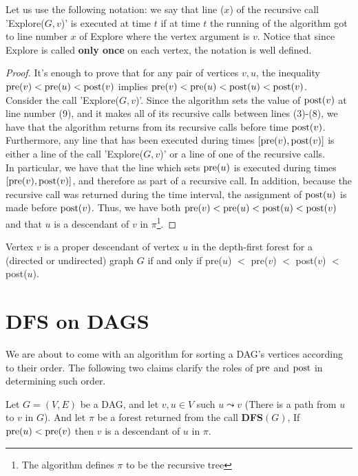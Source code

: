 Let us use the following notation: we say that line ($x$) of the recursive call 'Explore($G,v$)' is executed at time $t$ if at time $t$ the running of the algorithm got to line number $x$ of Explore where the vertex argument is $v$. Notice that since Explore is called \textbf{only once} on each vertex, the notation is well defined.
\begin{proof}
  
It's enough to prove that for any pair of vertices $v, u$, the inequality $\text{pre}(v) < \text{pre}(u) < \text{post}(v)$ implies $\text{pre}(v) < \text{pre}(u) < \text{post}(u) < \text{post}(v)$. \\


Consider the call 'Explore($G,v$)'. Since the algorithm sets the value of $\text{post}(v)$ at line number (9), and it makes all of its recursive calls between lines (3)-(8), we have that the algorithm returns from its recursive calls before time $\text{post}(v)$. Furthermore, any line that has been executed during times $[\text{pre}(v), \text{post}(v)]$ is either a line of the call 'Explore($G,v$)' or a line of one of the recursive calls.\\


In particular, we have that the line which sets $\text{pre}(u)$ is executed during times $[\text{pre}(v), \text{post}(v)]$, and therefore as part of a recursive call. In addition, because the recursive call was returned during the time interval, the assignment of $\text{post}(u)$ is made before $\text{post}(v)$. Thus, we have both $\text{pre}(v) < \text{pre}(u) < \text{post}(u) < \text{post}(v)$ and that $u$ is a descendant of $v$ in $\pi$\footnote{The algorithm defines $\pi$ to be the recursive tree}. 

\end{proof}

\begin{corollary}
  Vertex $v$ is a proper descendant of vertex $u$ in the depth-first forest for a (directed or undirected) graph $G$ if and only if pre($u$) $<$ pre($v$) $<$ post($v$) $<$ post($u$).
\end{corollary}


\section{DFS on DAGS}
We are about to come with an algorithm for sorting a DAG's vertices according to their order. The following two claims clarify the roles of $\text{pre}$ and $\text{post}$ in determining such order.

\begin{claim}
  \label{claim:dag}
  Let $G=(V,E)$ be a DAG, and let $v,u \in V$ such $u \leadsto v$ (There is a path from $u$ to $v$ in $G$). And let $\pi$ be a forest returned from the call \textbf{DFS$(G)$}, If $\text{pre}(u) < \text{pre}(v)$ then $v$ is a descendant of $u$ in $\pi$. 
\end{claim}

